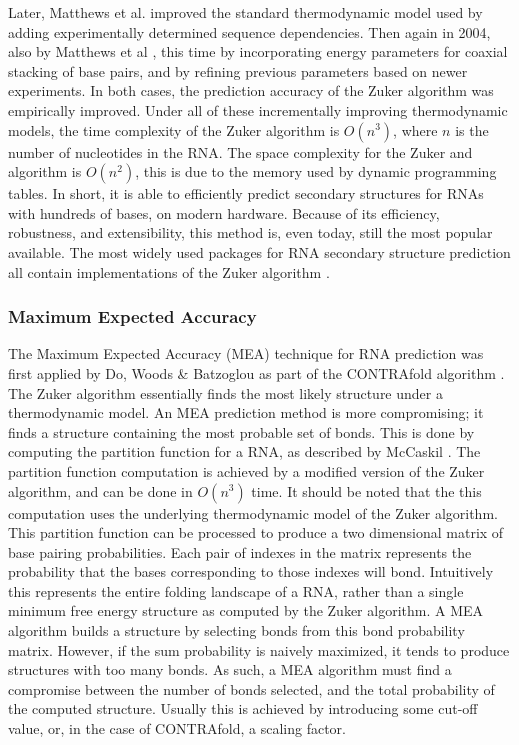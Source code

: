 \documentclass[12pt, a4paper]{article}
\begin{document}
Later, Matthews et al. \cite{mathews1999expanded} improved the standard thermodynamic model used by adding experimentally determined sequence dependencies. Then again in 2004, also by Matthews et al \cite{mathews2004incorporating}, this time by incorporating energy parameters for coaxial stacking of base pairs, and by refining previous parameters based on newer experiments. In both cases, the prediction accuracy of the Zuker algorithm was empirically improved. Under all of these incrementally improving thermodynamic models, the time complexity of the Zuker algorithm is $O(n^3)$, where $n$ is the number of nucleotides in the RNA. The space complexity for the Zuker and algorithm is $O(n^2)$, this is due to the memory used by dynamic programming tables. In short, it is able to efficiently predict secondary structures for RNAs with hundreds of bases, on modern hardware.  Because of
its efficiency, robustness, and extensibility, this method is,
even today, still the most popular available. The most widely used packages for RNA secondary structure prediction all contain implementations of the Zuker algorithm \cite{lorenz2011viennarna, reuter2010rnastructure}.

\subsubsection{Maximum Expected Accuracy}
The Maximum Expected Accuracy (MEA) technique for RNA prediction was first applied by Do, Woods \& Batzoglou as part of the CONTRAfold algorithm \cite{do2006contrafold}. The Zuker algorithm essentially finds the most likely structure under a thermodynamic model. An MEA prediction method is more compromising; it finds a structure containing the most probable set of bonds. This is done by computing the partition function for a RNA, as described by McCaskil \cite{mccaskill1990equilibrium}. The partition function computation is achieved by a modified version of the Zuker algorithm, and can be done in $O(n^3)$ time. It should be noted that the this computation uses the underlying thermodynamic model of the Zuker algorithm. This partition function can be processed to produce a two dimensional matrix of base pairing probabilities. Each pair of indexes in the matrix represents the probability that the bases corresponding to those indexes will bond. Intuitively this represents the entire folding landscape of a RNA, rather than a single minimum free energy structure as computed by the Zuker algorithm. A MEA algorithm builds a structure by selecting bonds from this bond probability matrix. However, if the sum probability is naively maximized, it tends to produce structures with too many bonds. As such, a MEA algorithm must find a compromise between the number of bonds selected, and the total probability of the computed structure. Usually this is achieved by introducing some cut-off value, or, in the case of CONTRAfold, a scaling factor.
\end{document}
